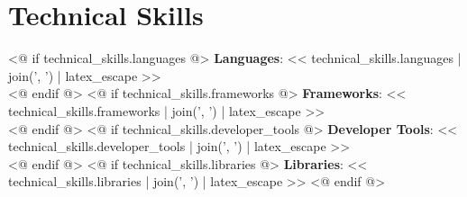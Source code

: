 \documentclass[letterpaper,11pt]{article}
\begin{document}
\section{Technical Skills}
 \begin{itemize}[leftmargin=0.15in, label={}]
    \small{\item{
     <@ if technical_skills.languages @>
     \textbf{Languages}{: << technical_skills.languages | join(', ') | latex_escape >>} \\
     <@ endif @>
     <@ if technical_skills.frameworks @>
     \textbf{Frameworks}{: << technical_skills.frameworks | join(', ') | latex_escape >>} \\
     <@ endif @>
     <@ if technical_skills.developer_tools @>
     \textbf{Developer Tools}{: << technical_skills.developer_tools | join(', ') | latex_escape >>} \\
     <@ endif @>
     <@ if technical_skills.libraries @>
     \textbf{Libraries}{: << technical_skills.libraries | join(', ') | latex_escape >>}
     <@ endif @>
    }}
 \end{itemize}
\end{document}
